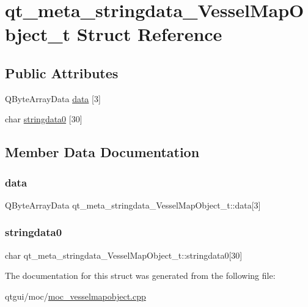 \hypertarget{structqt__meta__stringdata___vessel_map_object__t}{}\section{qt\+\_\+meta\+\_\+stringdata\+\_\+\+Vessel\+Map\+Object\+\_\+t Struct Reference}
\label{structqt__meta__stringdata___vessel_map_object__t}
\subsection*{Public Attributes}
\begin{DoxyCompactItemize}
\item 
Q\+Byte\+Array\+Data \mbox{\hyperlink{structqt__meta__stringdata___vessel_map_object__t_a1fbc3c371dc0a70d24fa3f3d514d1f6f}{data}} \mbox{[}3\mbox{]}
\item 
char \mbox{\hyperlink{structqt__meta__stringdata___vessel_map_object__t_a8df1852ec74bb2e73d1105d044c885f9}{stringdata0}} \mbox{[}30\mbox{]}
\end{DoxyCompactItemize}


\subsection{Member Data Documentation}
\mbox{\label{structqt__meta__stringdata___vessel_map_object__t_a1fbc3c371dc0a70d24fa3f3d514d1f6f}} 
\subsubsection{\texorpdfstring{data}{data}}
{\footnotesize\ttfamily Q\+Byte\+Array\+Data qt\+\_\+meta\+\_\+stringdata\+\_\+\+Vessel\+Map\+Object\+\_\+t\+::data\mbox{[}3\mbox{]}}

\mbox{\label{structqt__meta__stringdata___vessel_map_object__t_a8df1852ec74bb2e73d1105d044c885f9}} 
\subsubsection{\texorpdfstring{stringdata0}{stringdata0}}
{\footnotesize\ttfamily char qt\+\_\+meta\+\_\+stringdata\+\_\+\+Vessel\+Map\+Object\+\_\+t\+::stringdata0\mbox{[}30\mbox{]}}



The documentation for this struct was generated from the following file\+:\begin{DoxyCompactItemize}
\item 
qtgui/moc/\mbox{\hyperlink{moc__vesselmapobject_8cpp}{moc\+\_\+vesselmapobject.\+cpp}}\end{DoxyCompactItemize}
